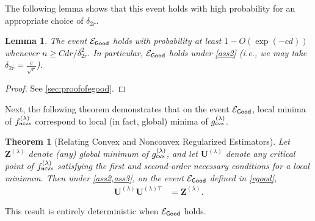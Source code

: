 \documentclass[10pt]{article}
\newtheorem{theorem}{Theorem}
\newtheorem{lemma}{Lemma}
\theoremstyle{definition}
\begin{document}
The following lemma shows that this event holds with high probability for an appropriate choice of $\delta_{2r}$.  

\begin{lemma} \label{lem:Egood}
The event $\mathcal{E}_{{\sf Good}}$ holds with probability at least $1 - O(\exp(- c d))$ whenever $n \geq C dr /\delta_{2r}^2$. In particular, $\mathcal{E}_{{\sf Good}}$ holds under \cref{ass2} (i.e., we may take $\delta_{2r} = \frac{c}{\sqrt{r}}$).
\end{lemma}
\begin{proof}
    See \cref{sec:proofofegood}.
\end{proof}

Next,  the following theorem demonstrates that on the event $\mathcal{E}_{{\sf Good}}$, local minima of $f^{(\lambda)}_{{\sf ncvx}}$ correspond to local (in fact, global) minima of $g^{(\lambda)}_{{\sf cvx}}$.   
\begin{theorem}[Relating Convex and Nonconvex Regularized Estimators] \label{thm:relatecvxncvx}
Let $\bm{Z}^{(\lambda)}$ denote (any) global minimum of $g^{(\lambda)}_{{\sf cvx}}$, and let $\bm{U}^{(\lambda)}$ denote any critical point of $f^{(\lambda)}_{{\sf ncvx}}$ satisfying the first and second-order necessary conditions for a local minimum.  Then under \cref{ass2,ass3}, 
on the event $\mathcal{E}_{{\sf Good}}$ defined in \eqref{egood}, 
\begin{align}
    \bm{U}^{(\lambda)} \bm{U}^{(\lambda)\top} &= \bm{Z}^{(\lambda)}.
\end{align}
\end{theorem}
This result is entirely deterministic when $\mathcal{E}_{{\sf Good}}$ holds. 
\end{document}
